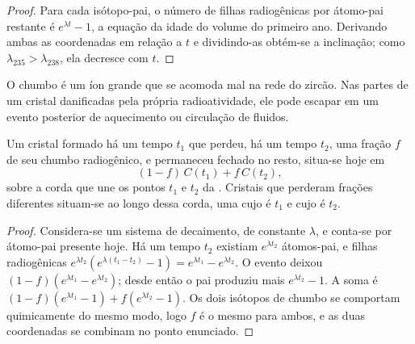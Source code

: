 \begin{proof}
Para cada isótopo-pai, o número de filhas radiogênicas por átomo-pai restante é
$e^{\lambda t} - 1$, a equação da idade do volume do primeiro ano. Derivando
ambas as coordenadas em relação a $t$ e dividindo-as obtém-se a inclinação; como
$\lambda_{235} > \lambda_{238}$, ela decresce com $t$.
\end{proof}

O chumbo é um íon grande que se acomoda mal na rede do zircão. Nas partes de um
cristal danificadas pela própria radioatividade, ele pode escapar em um evento posterior de
aquecimento ou circulação de fluidos.

\begin{theorem}\label{thm:b3:advanced-geochronology:discordia}
Um cristal formado há um tempo $t_1$ que perdeu, há um tempo $t_2$, uma fração $f$
de seu chumbo radiogênico, e permaneceu fechado no resto, situa-se hoje em
\[
(1 - f)\,C(t_1) + f\,C(t_2),
\]
sobre a corda que une os pontos $t_1$ e $t_2$ da . Cristais que
perderam frações diferentes situam-se ao longo dessa corda, uma  cujo 
é $t_1$ e cujo  é $t_2$.
\end{theorem}

\begin{proof}
Considera-se um sistema de decaimento, de constante $\lambda$, e conta-se por átomo-pai
presente hoje. Há um tempo $t_2$ existiam $e^{\lambda t_2}$ átomos-pai, e
filhas radiogênicas $e^{\lambda t_2}(e^{\lambda(t_1 - t_2)} - 1) =
e^{\lambda t_1} - e^{\lambda t_2}$. O evento deixou $(1 - f)(e^{\lambda t_1} -
e^{\lambda t_2})$; desde então o pai produziu mais $e^{\lambda t_2} - 1$. A
soma é $(1 - f)(e^{\lambda t_1} - 1) + f(e^{\lambda t_2} - 1)$. Os dois isótopos
de chumbo se comportam quimicamente do mesmo modo, logo $f$ é o mesmo para ambos, e as duas
coordenadas se combinam no ponto enunciado.
\end{proof}

